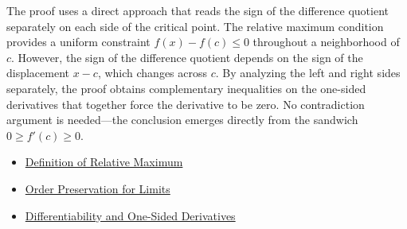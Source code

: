 \begin{remark*}
The proof uses a direct approach that reads the sign of the difference quotient separately on each side of the critical point. The relative maximum condition provides a uniform constraint $f(x) - f(c) \leq 0$ throughout a neighborhood of $c$. However, the sign of the difference quotient depends on the sign of the displacement $x - c$, which changes across $c$. By analyzing the left and right sides separately, the proof obtains complementary inequalities on the one-sided derivatives that together force the derivative to be zero. No contradiction argument is needed---the conclusion emerges directly from the sandwich $0 \geq f'(c) \geq 0$.
\end{remark*}

\begin{dependencies}
\begin{itemize}
  \item \hyperref[def:relative-maximum]{Definition of Relative Maximum}
  \item \hyperref[thm:order-preservation-limits]{Order Preservation for Limits}
  \item \hyperref[thm:differentiability-and-one-sided-derivatives]{Differentiability and One-Sided Derivatives}
\end{itemize}
\end{dependencies}

\clearpage
